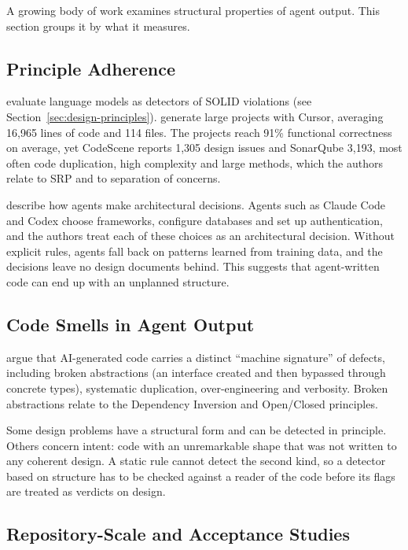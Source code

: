 A growing body of work examines structural properties of agent output. This section groups it by
what it measures.

\subsection{Principle Adherence}

\citet{pehlivan2025solid} evaluate language models as detectors of SOLID violations (see
Section~\ref{sec:design-principles}). \citet{beyond2026designissues} generate large projects with
Cursor, averaging 16,965 lines of code and 114 files. The projects reach 91\% functional correctness
on average, yet CodeScene reports 1,305 design issues and SonarQube 3,193, most often code
duplication, high complexity and large methods, which the authors relate to SRP and to separation
of concerns.

\citet{konrad2026vibe} describe how agents make architectural decisions. Agents such as Claude
Code and Codex choose frameworks, configure databases and set up authentication, and the authors
treat each of these choices as an architectural decision. Without explicit rules, agents fall back
on patterns learned from training data, and the decisions leave no design documents behind. This
suggests that agent-written code can end up with an unplanned structure.

\subsection{Code Smells in Agent Output}

\citet{zhu2026smells} argue that AI-generated code carries a distinct ``machine signature'' of
defects, including broken abstractions (an interface created and then bypassed through concrete
types), systematic duplication, over-engineering and verbosity. Broken abstractions relate to the
Dependency Inversion and Open/Closed principles.

Some design problems have a structural form and can be detected in principle. Others concern intent:
code with an unremarkable shape that was not written to any coherent design. A static rule cannot
detect the second kind, so a detector based on structure has to be checked against a reader of the
code before its flags are treated as verdicts on design.

\subsection{Repository-Scale and Acceptance Studies}


